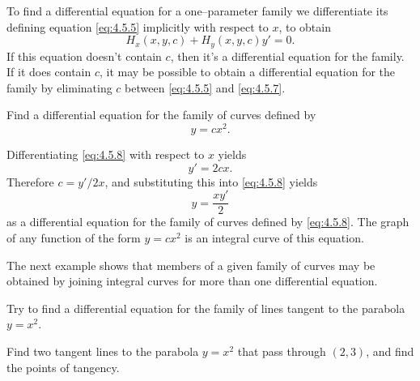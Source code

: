 To find a differential equation for a one--parameter family we differentiate its defining equation
\eqref{eq:4.5.5} implicitly with respect to $x$, to obtain
\begin{equation}
  \label{eq:4.5.7}H_{x}(x,y,c)+H_{y}(x,y,c)y'=0.
\end{equation}
If this equation doesn't contain $c$, then it's a differential equation for the family. If it does contain $c$,
it may be possible to obtain a differential equation for the family by eliminating $c$ between
\eqref{eq:4.5.5} and \eqref{eq:4.5.7}.

\begin{example}
  \label{example:4.5.5} \rm Find a differential equation for the family of curves defined by
  \begin{equation}
    \label{eq:4.5.8}y=cx^{2}.
  \end{equation}
\end{example}

\begin{examplesolution}
\solution Differentiating \eqref{eq:4.5.8} with respect to $x$ yields
\[
  y'=2cx.
\]
Therefore $c=y'/2x$, and substituting this into \eqref{eq:4.5.8} yields
\[
  y=\frac{xy'}{2}
\]
as a differential equation for the family of curves defined by \eqref{eq:4.5.8}. The graph of any
function of the form $y=cx^{2}$ is an integral curve of this equation. \bbox
\end{examplesolution}

The next example shows that members of a given family of curves may be obtained by joining integral
curves for more than one differential equation.

\begin{example}
  \label{example:4.5.6} \rm \mbox{}
  \begin{alist}
    \item %
    Try to find a differential equation for the family of lines tangent to the parabola $y=x^{2}$.

    \item %
    Find two tangent lines to the parabola $y=x^{2}$ that pass through $(2,3)$, and find the points
    of tangency.
  \end{alist}
\end{example}

